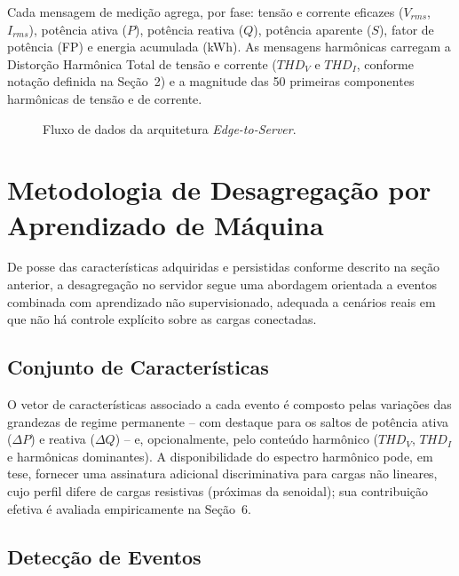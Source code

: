 \documentclass[12pt]{article}
\begin{document}
Cada mensagem de medi\c{c}\~ao agrega, por fase: tens\~ao e corrente eficazes
($V_{rms}$, $I_{rms}$), pot\^encia ativa ($P$), pot\^encia reativa ($Q$),
pot\^encia aparente ($S$), fator de pot\^encia (FP) e energia acumulada (kWh).
As mensagens harm\^onicas carregam a Distor\c{c}\~ao Harm\^onica Total de tens\~ao
e corrente ($THD_V$ e $THD_I$, conforme nota\c{c}\~ao definida na Se\c{c}\~ao~2) e
a magnitude das 50 primeiras componentes harm\^onicas de tens\~ao e de corrente.

\begin{figure}[ht]
  \centering
  \caption{Fluxo de dados da arquitetura \textit{Edge-to-Server}.}
  \label{fig:pipeline}
\end{figure}
\FloatBarrier


\section{Metodologia de Desagrega\c{c}\~ao por Aprendizado de M\'aquina}

De posse das caracter\'isticas adquiridas e persistidas conforme descrito na
se\c{c}\~ao anterior, a desagrega\c{c}\~ao no servidor segue uma abordagem
orientada a eventos combinada com aprendizado n\~ao supervisionado, adequada a
cen\'arios reais em que n\~ao h\'a controle expl\'icito sobre as cargas
conectadas.

\subsection{Conjunto de Caracter\'isticas}

O vetor de caracter\'isticas associado a cada evento \'e composto pelas
varia\c{c}\~oes das grandezas de regime permanente -- com destaque para os
saltos de pot\^encia ativa ($\Delta P$) e reativa ($\Delta Q$) -- e,
opcionalmente, pelo conte\'udo harm\^onico ($THD_V$, $THD_I$ e harm\^onicas
dominantes). A disponibilidade do espectro harm\^onico pode, em tese,
fornecer uma assinatura adicional discriminativa para cargas n\~ao lineares,
cujo perfil difere de cargas resistivas (pr\'oximas da senoidal);
sua contribui\c{c}\~ao efetiva \'e avaliada empiricamente na Se\c{c}\~ao~6.

\subsection{Detec\c{c}\~ao de Eventos}
\end{document}
